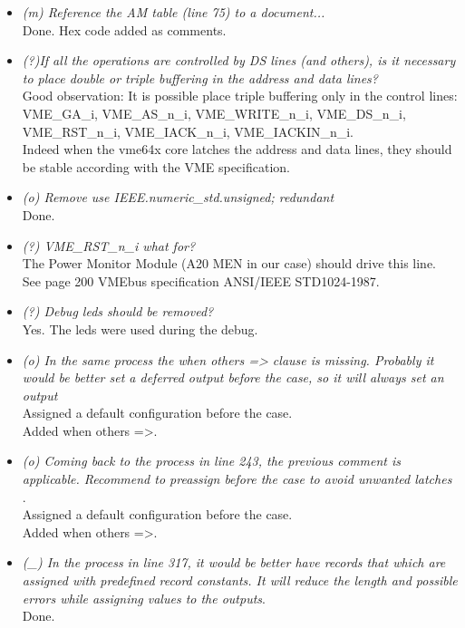 \documentclass[a4paper,11pt]{article}
\begin{document}
\begin{itemize}
\item \textit{(m) Reference the AM table (line 75) to a document...}\\
Done. Hex code added as comments.
\item \textit{(?)If all the operations are controlled by DS lines (and others), 
is it necessary to place double or triple buffering in the address and data 
lines?} \\
Good observation: It is possible place triple buffering only in the control
lines: VME\_GA\_i, VME\_AS\_n\_i, VME\_WRITE\_n\_i, VME\_DS\_n\_i, VME\_RST\_n\_i, VME\_IACK\_n\_i, VME\_IACKIN\_n\_i.\\
Indeed when the vme64x core latches the address and data lines, they should be stable according with the VME specification.
\item \textit{(o) Remove use IEEE.numeric\_std.unsigned; redundant}\\
Done.
\item \textit{(?) VME\_RST\_n\_i what for?}\\
The Power Monitor Module (A20 MEN in our case) should drive this line.
See page 200 VMEbus specification ANSI/IEEE STD1024-1987.
\item \textit{(?) Debug leds should be removed?}\\
Yes. The leds were used during the debug. 
\item \textit{(o) In the same process the when others => clause is missing. 
             Probably it would be better set a deferred output before the case, 
             so it will always set an output}\\
Assigned a default configuration before the case.\\
Added when others =>.
\item \textit{(o) Coming back to the process in line 243, the previous comment 
is applicable.  Recommend to preassign before the case to avoid unwanted latches
}.\\
Assigned a default configuration before the case.\\
Added when others =>.

\item \textit{(\_) In the process in line 317, it would be better have records that
       which are assigned with predefined record constants. It will reduce the
       length and possible errors while assigning values to the outputs}.\\
Done.
\end{itemize}
\end{document}
